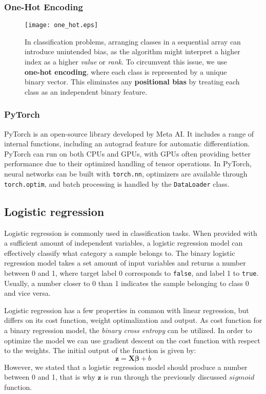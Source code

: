 \documentclass{article}
\begin{document}
\begin{multicols}{2}
\subsubsection*{One-Hot Encoding}
\begin{figure}[H]
    \centering
    \texttt{[image: one\_hot.eps]}
    \caption{In classification problems, arranging classes in a sequential array can introduce unintended bias, as the algorithm might interpret a higher index as a higher \textit{value} or \textit{rank}. To circumvent this issue, we use \textbf{one-hot encoding}, where each class is represented by a unique binary vector. This eliminates any \textbf{positional bias} by treating each class as an independent binary feature.}
    \label{fig:one_hot}
\end{figure}

\subsubsection*{PyTorch}
PyTorch is an open-source library developed by Meta AI. It includes a range of internal functions, including an autograd feature for automatic differentiation. PyTorch can run on both CPUs and GPUs, with GPUs often providing better performance due to their optimized handling of tensor operations. In PyTorch, neural networks can be built with \texttt{torch.nn}, optimizers are available through \texttt{torch.optim}, and batch processing is handled by the \texttt{DataLoader} class. \cite{paszke2019pytorch}

\subsection*{Logistic regression}
Logistic regression is commonly used in classification tasks. When provided with a sufficient amount of independent variables, a logistic regression model can effectively classify what category a sample belongs to. The binary logistic regression model takes a set amount of input variables and returns a number between 0 and 1, where target label 0 corresponds to \texttt{false}, and label 1 to \texttt{true}. Usually, a number closer to 0 than 1 indicates the sample belonging to class 0 and vice versa. \cite{noauthor_what_2021}

Logistic regression has a few properties in common with linear regression, but differs on its cost function, weight optimalization and output. As cost function for a binary regression model, the \textit{binary cross entropy} can be utilized. In order to optimize the model we can use gradient descent on the cost function with respect to the weights. The initial output of the function is given by: 
\begin{equation}
 \label{eq:otuput_logreg}
    \bm{z} = \mathbf{X}\bm{\beta} + b
\end{equation}
However, we stated that a logistic regression model should produce a number between 0 and 1, that is why $\bm{z}$ is run through the previously discussed $\textit{sigmoid}$ function. \cite{jurafsky_chapter_2024}


\end{multicols}
\end{document}
